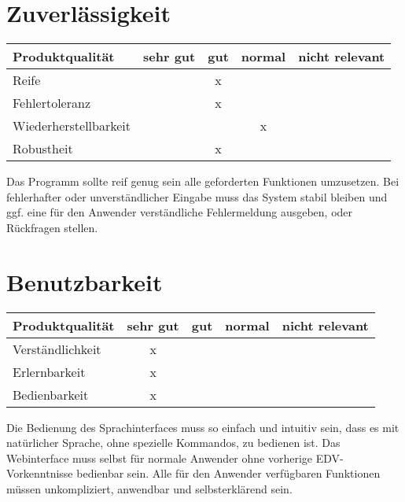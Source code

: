 \section{Zuverlässigkeit}
\begin{tabular}{|l|c|c|c|c|}
	\hline
	\textbf{Produktqualität} & \textbf{sehr gut} & \textbf{gut} & \textbf{normal} & \textbf{nicht relevant} \\ \hline
	Reife                    &                   &       x      &                 &                         \\ \hline
	Fehlertoleranz           &                   &       x      &                 &                         \\ \hline
	Wiederherstellbarkeit    &                   &              &        x        &                        \\ \hline
	Robustheit               &                   &       x      &                 &           				\\ \hline
\end{tabular}

Das Programm sollte reif genug sein alle geforderten Funktionen umzusetzen.
Bei fehlerhafter oder unverständlicher Eingabe muss das System stabil bleiben und ggf. eine für den Anwender verständliche Fehlermeldung ausgeben, oder Rückfragen stellen.

\section{Benutzbarkeit}
\begin{tabular}{|l|c|c|c|c|}
	\hline
	\textbf{Produktqualität} & \textbf{sehr gut} & \textbf{gut} & \textbf{normal} & \textbf{nicht relevant} \\ \hline
	Verständlichkeit         &        x          &              &                 &                         \\ \hline
	Erlernbarkeit            &        x          &              &                 &                         \\ \hline
	Bedienbarkeit            &        x          &              &                 &                         \\ \hline
\end{tabular}

Die Bedienung des Sprachinterfaces muss so einfach und intuitiv sein, dass es mit natürlicher Sprache, ohne  spezielle Kommandos, zu bedienen ist.
Das Webinterface muss selbst für normale Anwender ohne vorherige EDV-Vorkenntnisse bedienbar sein.
Alle für den Anwender verfügbaren Funktionen müssen unkompliziert, anwendbar und selbsterklärend sein.

